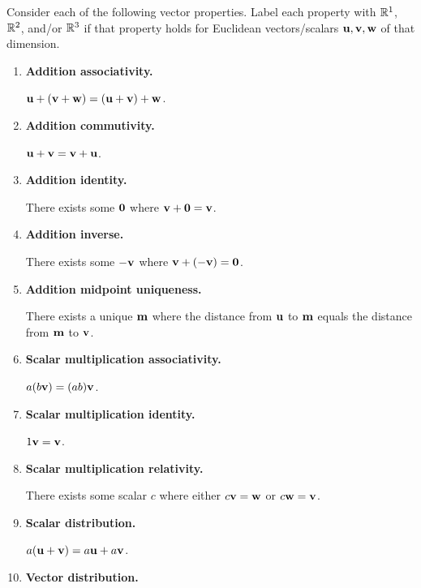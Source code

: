 
\begin{applicationActivities}{1}{7}


\begin{activity}{25}
Consider each of the following vector properties. Label each property
with \(\mathbb{R}^1\), \(\mathbb{R}^2\), and/or \(\mathbb{R}^3\) if that property holds for
Euclidean vectors/scalars \(\mathbf u,\mathbf v,\mathbf w\) of that dimension.
\begin{multicols}{2}
\begin{enumerate}
  \item \textbf{Addition associativity.}

        \(\mathbf u+(\mathbf v+\mathbf w)=
        (\mathbf u+\mathbf v)+\mathbf w\).
  \item \textbf{Addition commutivity.}

        \(\mathbf u+\mathbf v=
        \mathbf v+\mathbf u\).
  \item \textbf{Addition identity.}

        There exists some \(\mathbf 0\)
        where \(\mathbf v+\mathbf 0=\mathbf v\).
  \item \textbf{Addition inverse.}

        There exists some \(-\mathbf v\)
        where \(\mathbf v+(-\mathbf v)=\mathbf 0\).
  \item \textbf{Addition midpoint uniqueness.}

        There exists a unique \(\mathbf m\) where the distance from
        \(\mathbf u\) to \(\mathbf m\) equals the distance from \(\mathbf m\)
        to \(\mathbf v\).
  \item \textbf{Scalar multiplication associativity.}

        \(a(b\mathbf v)=(ab)\mathbf v\).
  \item \textbf{Scalar multiplication identity.}

        \(1\mathbf v=\mathbf v\).
  \item \textbf{Scalar multiplication relativity.}

        There exists some scalar \(c\) where either \(c\mathbf v=\mathbf w\)
        or \(c\mathbf w=\mathbf v\).
  \item \textbf{Scalar distribution.}

        \(a(\mathbf u+\mathbf v)=a\mathbf u+a\mathbf v\).
  \item \textbf{Vector distribution.}


\end{enumerate}
\end{multicols}
\end{activity}
\end{applicationActivities}
